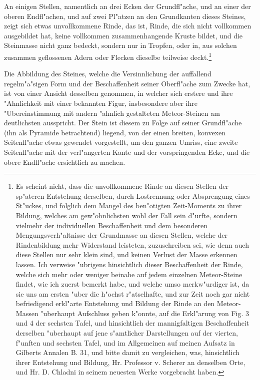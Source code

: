 \documentclass[a4paper, 11pt, oneside, german]{article}
\begin{document}
An einigen Stellen, namentlich an drei Ecken der Grundfl"ache, und an einer der oberen Endfl"achen, und auf zwei Pl"atzen an den Grundkanten dieses Steines, zeigt sich etwas unvollkommene Rinde, das ist, Rinde, die sich nicht vollkommen ausgebildet hat, keine vollkommen zusammenhangende Kruste bildet, und die Steinmasse nicht ganz bedeckt, sondern nur in Tropfen, oder in, aus solchen zusammen geflossenen Adern oder Flecken dieselbe teilweise deckt.\footnote{Es scheint nicht, dass die unvollkommene Rinde an diesen Stellen der sp"ateren Entstehung derselben, durch Lostrennung oder Absprengung eines St"uckes, und folglich dem Mangel des ben"otigten Zeit-Moments zu ihrer Bildung, welches am gew"ohnlichsten wohl der Fall sein d"urfte, sondern vielmehr der individuellen Beschaffenheit und dem besonderen Mengungsverh"altnisse der Grundmasse an diesen Stellen, welche der Rindenbildung mehr Widerstand leisteten, zuzuschreiben sei, wie denn auch diese Stellen nur sehr klein sind, und keinen Verlust der Masse erkennen lassen. Ich verweise "ubrigens hinsichtlich dieser Beschaffenheit der Rinde, welche sich mehr oder weniger beinahe auf jedem einzelnen Meteor-Steine findet, wie ich zuerst bemerkt habe, und welche umso merkw"urdiger ist, da sie uns am ersten "uber die h"ochst r"atselhafte, und zur Zeit noch gar nicht befriedigend erkl"arte Entstehung und Bildung der Rinde an den Meteor-Massen "uberhaupt Aufschluss geben k"onnte, auf die Erkl"arung von Fig. 3 und 4 der sechsten Tafel, und hinsichtlich der mannigfaltigen Beschaffenheit derselben "uberhaupt auf jene s"amtlicher Darstellungen auf der vierten, f"unften und sechsten Tafel, und im Allgemeinen auf meinen Aufsatz in Gilberts Annalen B. 31, und bitte damit zu vergleichen, was, hinsichtlich ihrer Entstehung und Bildung, Hr. Professor v. Scherer an denselben Orte, und Hr. D. Chladni in seinem neuesten Werke vorgebracht haben.}

Die Abbildung des Steines, welche die Versinnlichung der auffallend regelm"a"sigen Form und der Beschaffenheit seiner Oberfl"ache zum Zwecke hat, ist von einer Ansicht desselben genommen, in welcher sich erstere und ihre "Ahnlichkeit mit einer bekannten Figur, insbesondere aber ihre "Ubereinstimmung mit andern "ahnlich gestalteten Meteor-Steinen am deutlichsten ausspricht. Der Stein ist diesem zu Folge auf seiner Grundfl"ache (ihn als Pyramide betrachtend) liegend, von der einen breiten, konvexen Seitenfl"ache etwas gewendet vorgestellt, um den ganzen Umriss, eine zweite Seitenfl"ache mit der verl"angerten Kante und der vorspringenden Ecke, und die obere Endfl"ache ersichtlich zu machen.
\end{document}
